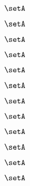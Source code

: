 \begin{forslides}
\begin{forslides}
    \begin{equation}
        \label{eq:slides-translation-145}
        \setA
    \end{equation}

    \begin{equation}
        \label{eq:slides-translation-146}
        \setA
    \end{equation}

    \begin{equation}
        \label{eq:slides-translation-147}
        \setA
    \end{equation}

    \begin{equation}
        \label{eq:slides-translation-148}
        \setA
    \end{equation}

    \begin{equation}
        \label{eq:slides-translation-149}
        \setA
    \end{equation}

    \begin{equation}
        \label{eq:slides-translation-150}
        \setA
    \end{equation}

    \begin{equation}
        \label{eq:slides-translation-151}
        \setA
    \end{equation}

    \begin{equation}
        \label{eq:slides-translation-152}
        \setA
    \end{equation}

    \begin{equation}
        \label{eq:slides-translation-153}
        \setA
    \end{equation}

    \begin{equation}
        \label{eq:slides-translation-154}
        \setA
    \end{equation}

    \begin{equation}
        \label{eq:slides-translation-155}
        \setA
    \end{equation}

    \begin{equation}
        \label{eq:slides-translation-156}
        \setA
    \end{equation}


\end{forslides}
\end{forslides}
